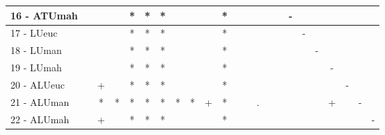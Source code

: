 \begin{table}[h]
\begin{center}
\begin{tabular}{lcc|cc|cc|cc|cc|cc|cc|cc|cc|cc|cc}
16 - ATUmah	&   &   &   & * & * & * &   &   &   & * &   &   &   &   &   & - &   &   &   &   &   &   \\ \hline
17 - LUeuc	&   &   &   & * & * & * &   &   &   & * &   &   &   &   &   &   & - &   &   &   &   &   \\
18 - LUman	&   &   &   & * & * & * &   &   &   & * &   &   &   &   &   &   &   & - &   &   &   &   \\ \hline
19 - LUmah	&   &   &   & * & * & * &   &   &   & * &   &   &   &   &   &   &   &   & - &   &   &   \\
20 - ALUeuc	&   & + &   & * & * & * &   &   &   & * &   &   &   &   &   &   &   &   &   & - &   &   \\ \hline
21 - ALUman	&   & * & * & * & * & * & * & * & + & * &   &   & . &   &   &   &   &   & + &   & - &   \\
22 - ALUmah	&   & + &   & * & * & * &   &   &   & * &   &   &   &   &   &   &   &   &   &   &   & - \\ \hline\end{tabular}
\label{stratsBalAccFried}
\end{center}
\end{table}